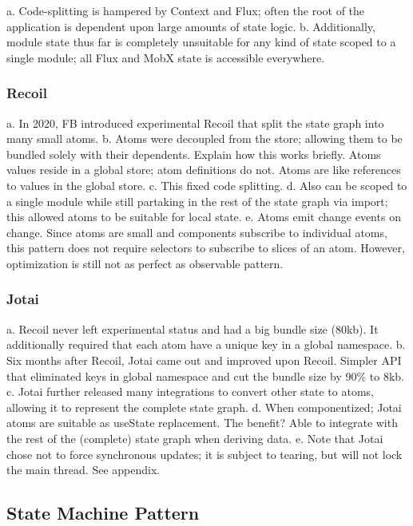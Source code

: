 \documentclass{article}
\begin{document}
a. Code-splitting is hampered by Context and Flux; often the root of the application is dependent upon large amounts of state logic.
b. Additionally, module state thus far is completely unsuitable for any kind of state scoped to a single module; all Flux and MobX state is accessible everywhere.

\subsubsection{Recoil}

a. In 2020, FB introduced experimental Recoil that split the state graph into many small atoms.
b. Atoms were decoupled from the store; allowing them to be bundled solely with their dependents. Explain how this works briefly. Atoms values reside in a global store; atom definitions do not. Atoms are like references to values in the global store.
c. This fixed code splitting.
d. Also can be scoped to a single module while still partaking in the rest of the state graph via import; this allowed atoms to be suitable for local state.
e. Atoms emit change events on change. Since atoms are small and components subscribe to individual atoms, this pattern does not require selectors to subscribe to slices of an atom. However, optimization is still not as perfect as observable pattern.

\subsubsection{Jotai}

a. Recoil never left experimental status and had a big bundle size (80kb). It additionally required that each atom have a unique key in a global namespace.
b. Six months after Recoil, Jotai came out and improved upon Recoil. Simpler API that eliminated keys in global namespace and cut the bundle size by 90\% to 8kb.
c. Jotai further released many integrations to convert other state to atoms, allowing it to represent the complete state graph.
d. When componentized; Jotai atoms are suitable as useState replacement. The benefit? Able to integrate with the rest of the (complete) state graph when deriving data.
e. Note that Jotai chose not to force synchronous updates; it is subject to tearing, but will not lock the main thread. See appendix.

\subsection{State Machine Pattern}
\end{document}
